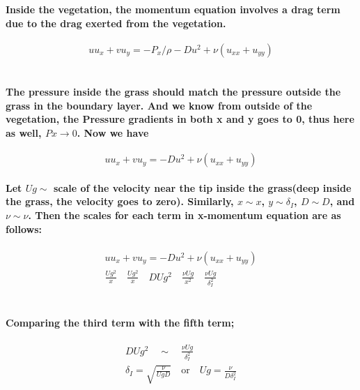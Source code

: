 \documentclass[11pt]{amsart}
\begin{document}
\paragraph{ \\Inside the vegetation, the momentum equation involves a drag term due to the drag exerted from the vegetation.\\}
\begin{equation}
uu_x+vu_y = -P_x/\rho -Du^2+ \nu (u_{xx} + u_{yy}) 
\end{equation}
\paragraph{\\The pressure inside the grass should match the pressure outside the grass in the boundary layer. And we know from outside of the vegetation, the Pressure gradients in both x and y goes to 0, thus here as well, \(Px \rightarrow 0\). Now we have\\}
\begin{equation}
uu_x+vu_y = -Du^2+ \nu (u_{xx} + u_{yy}) 
\label{inside_NS}
\end{equation}
\paragraph{ Let \(Ug \sim \) scale of the velocity near the tip inside the grass(deep inside the grass, the velocity goes to zero). Similarly, \(x \sim x\), \(y \sim \delta_I \), \(D \sim D\), and \(\nu \sim \nu \). Then the scales for each term in x-momentum equation are as follows:\\ }
\begin{gather}
uu_x+vu_y =  -Du^2+ \nu (u_{xx} + u_{yy})  \nonumber \\
\frac{Ug^2}{x}\quad \frac{Ug^2}{x}\quad DUg^2 \quad \frac{\nu Ug}{x^2} \quad \frac{\nu Ug}{\delta_I ^2} \nonumber
\end{gather}
\paragraph{ \\Comparing the third term with the fifth term;\\}
\begin{gather}
DUg^2 \quad \sim \quad \frac{\nu Ug}{\delta_I ^2} \nonumber \\
\delta_I = \sqrt{\frac{\nu}{UgD}} \quad \text{or} \quad Ug=\frac{\nu}{D\delta_I^2} \nonumber
\end{gather}
\end{document}
